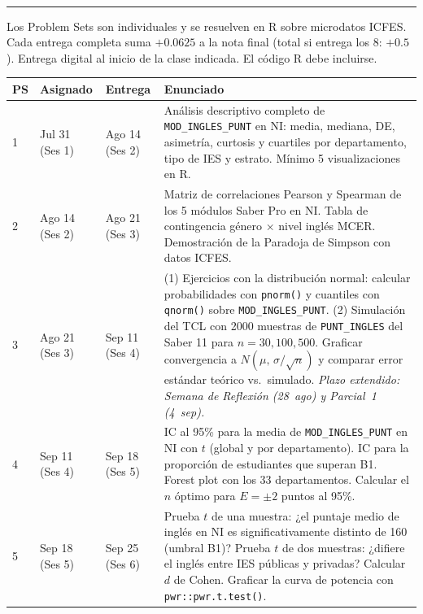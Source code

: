 \documentclass[11pt, a4paper]{article}
\newcommand{\sechead}[1]{%
  \vspace{10pt}%
  \noindent{\large\bfseries #1}\\[-6pt]%
  \rule{\linewidth}{0.5pt}%
  \vspace{2pt}%
}
\begin{document}
\newpage

\sechead{Problem Sets --- Trabajo Aut\'onomo}

Los Problem Sets son individuales y se resuelven en R sobre microdatos ICFES. Cada
entrega completa suma $\mathbf{+0.0625}$ a la nota final (total si entrega los 8: $\mathbf{+0.5}$).
Entrega digital al inicio de la clase indicada. El c\'odigo R debe incluirse.

\vspace{6pt}
{\small
\begin{tabularx}{\linewidth}{C{0.8cm} L{1.8cm} L{1.8cm} X}
\toprule
\textbf{PS} & \textbf{Asignado} & \textbf{Entrega} & \textbf{Enunciado} \\
 & Jul 31 (Ses 1) & Ago 14 (Ses 2) &
  An\'alisis descriptivo completo de \texttt{MOD\_INGLES\_PUNT} en NI: media, mediana, DE,
  asimetr\'ia, curtosis y cuartiles por departamento, tipo de IES y estrato. M\'inimo 5
  visualizaciones en R. \\[4pt]
2 & Ago 14 (Ses 2) & Ago 21 (Ses 3) &
  Matriz de correlaciones Pearson y Spearman de los 5 m\'odulos Saber Pro en NI.
  Tabla de contingencia g\'enero $\times$ nivel ingl\'es MCER.
  Demostraci\'on de la Paradoja de Simpson con datos ICFES. \\[4pt]
3 & Ago 21 (Ses 3) & Sep 11 (Ses 4) &
  (1) Ejercicios con la distribuci\'on normal: calcular probabilidades con
  \texttt{pnorm()} y cuantiles con \texttt{qnorm()} sobre \texttt{MOD\_INGLES\_PUNT}.
  (2) Simulaci\'on del TCL con 2000 muestras de \texttt{PUNT\_INGLES} del Saber 11 para
  $n = 30, 100, 500$. Graficar convergencia a $N(\mu,\,\sigma/\sqrt{n})$
  y comparar error est\'andar te\'orico vs.\ simulado.
  \textit{Plazo extendido: Semana de Reflexi\'on (28~ago) y Parcial~1 (4~sep).} \\[4pt]
4 & Sep 11 (Ses 4) & Sep 18 (Ses 5) &
  IC al 95\% para la media de \texttt{MOD\_INGLES\_PUNT} en NI con $t$ (global y por
  departamento). IC para la proporci\'on de estudiantes que superan B1.
  Forest plot con los 33 departamentos. Calcular el $n$ \'optimo para
  $E = \pm 2$ puntos al 95\%. \\[4pt]
5 & Sep 18 (Ses 5) & Sep 25 (Ses 6) &
  Prueba $t$ de una muestra: ¿el puntaje medio de ingl\'es en NI es
  significativamente distinto de 160 (umbral B1)?
  Prueba $t$ de dos muestras: ¿difiere el ingl\'es entre IES p\'ublicas y privadas?
  Calcular $d$ de Cohen. Graficar la curva de potencia con \texttt{pwr::pwr.t.test()}. \\[4pt]

\end{tabularx}}
\end{document}
